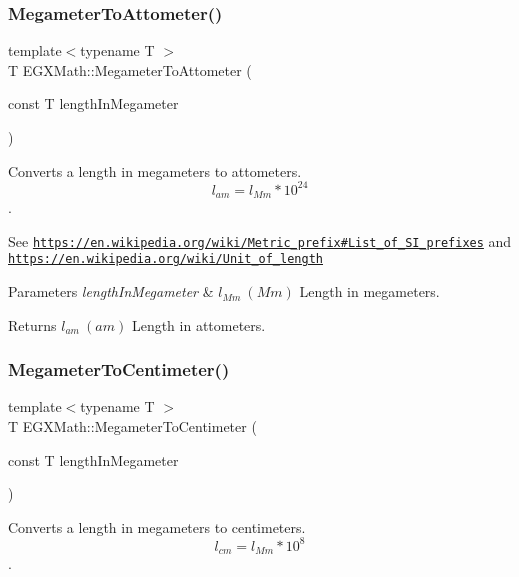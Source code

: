 \subsubsection{\texorpdfstring{Megameter\+To\+Attometer()}{MegameterToAttometer()}}
{\footnotesize\ttfamily template$<$typename T $>$ \\
T E\+G\+X\+Math\+::\+Megameter\+To\+Attometer (\begin{DoxyParamCaption}\item[{const T}]{length\+In\+Megameter }\end{DoxyParamCaption})}



Converts a length in megameters to attometers. \[ l_{am}=l_{Mm} * 10^{24} \]. 

See \href{https://en.wikipedia.org/wiki/Metric_prefix#List_of_SI_prefixes}{\tt https\+://en.\+wikipedia.\+org/wiki/\+Metric\+\_\+prefix\#\+List\+\_\+of\+\_\+\+S\+I\+\_\+prefixes} and \href{https://en.wikipedia.org/wiki/Unit_of_length}{\tt https\+://en.\+wikipedia.\+org/wiki/\+Unit\+\_\+of\+\_\+length} 
\begin{DoxyParams}{Parameters}
{\em length\+In\+Megameter} & $ l_{Mm}\ (Mm)$ Length in megameters. \\
\hline
\end{DoxyParams}
\begin{DoxyReturn}{Returns}
$ l_{am}\ (am)$ Length in attometers. 
\end{DoxyReturn}
\mbox{\label{group___e_g_x_math-_conversions-_length_conversions-_megameter-_s_i_gacbe2b41169d39f02fb70baedf0f8a9c4}} 
\subsubsection{\texorpdfstring{Megameter\+To\+Centimeter()}{MegameterToCentimeter()}}
{\footnotesize\ttfamily template$<$typename T $>$ \\
T E\+G\+X\+Math\+::\+Megameter\+To\+Centimeter (\begin{DoxyParamCaption}\item[{const T}]{length\+In\+Megameter }\end{DoxyParamCaption})}



Converts a length in megameters to centimeters. \[ l_{cm}=l_{Mm} * 10^{8} \]. 

